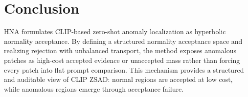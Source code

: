 \documentclass[10pt]{article}
\newcommand{\method}{HNA}
\begin{document}
\section{Conclusion}

\method{} formulates CLIP-based zero-shot anomaly localization as hyperbolic normality acceptance.
By defining a structured normality acceptance space and realizing rejection with unbalanced transport, the method exposes anomalous patches as high-cost accepted evidence or unaccepted mass rather than forcing every patch into flat prompt comparison.
This mechanism provides a structured and auditable view of CLIP ZSAD: normal regions are accepted at low cost, while anomalous regions emerge through acceptance failure.



\end{document}
